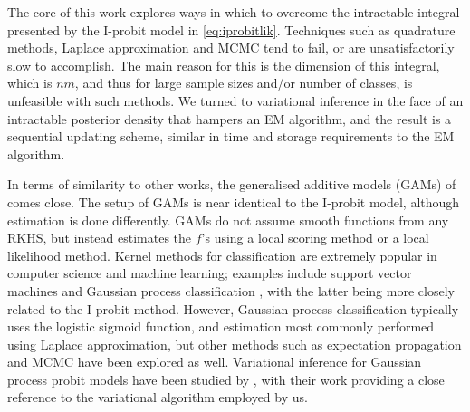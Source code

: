 \documentclass[a4paper,showframe,11pt]{report}
\begin{document}
The core of this work explores ways in which to overcome the intractable integral presented by the I-probit model in \cref{eq:iprobitlik}.
Techniques such as quadrature methods, Laplace approximation and MCMC tend to fail, or are unsatisfactorily slow to accomplish.
The main reason for this is the dimension of this integral, which is $nm$, and thus for large sample sizes and/or number of classes, is unfeasible with such methods.
We turned to variational inference in the face of an intractable posterior density that hampers an EM algorithm, and the result is a sequential updating scheme, similar in time and storage requirements to the EM algorithm.

In terms of similarity to other works, the generalised additive models (GAMs) of \citet{hastie1986} comes close.
The setup of GAMs is near identical to the I-probit model, although estimation is done differently. 
GAMs do not assume smooth functions from any RKHS, but instead estimates the $f$'s using a local scoring method or a local likelihood method.
Kernel methods for classification are extremely popular in computer science and machine learning; examples include support vector machines \citep{scholkopf2002learning} and Gaussian process classification \citep{rasmussen2006gaussian}, with the latter being more closely related to the I-probit method.
However, Gaussian process classification typically uses the logistic sigmoid function, and estimation most commonly performed using Laplace approximation, but other methods such as expectation propagation \citep{minka2001expectation} and MCMC \citep{neal1999} have been explored as well.
Variational inference for Gaussian process probit models have been studied by \citet{girolami2006variational}, with their work providing a close reference to the variational algorithm employed by us.
\end{document}
